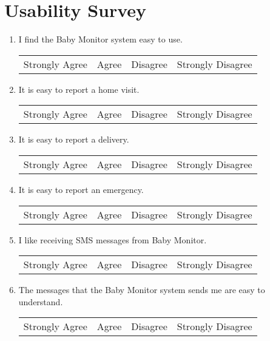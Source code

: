 \chapter{Usability Survey }

\begin{enumerate}
\item I find the Baby Monitor system easy to use.
{\begin{center}
\begin{tabular}{c c c c}
Strongly Agree & Agree & Disagree & Strongly Disagree \\
\end{tabular}
\end{center}}
\item It is easy to report a home visit. 
{\begin{center}
\begin{tabular}{c c c c}
Strongly Agree & Agree & Disagree & Strongly Disagree \\
\end{tabular}
\end{center}}
\item It is easy to report a delivery.
{\begin{center}
\begin{tabular}{c c c c}
Strongly Agree & Agree & Disagree & Strongly Disagree \\
\end{tabular}
\end{center}}
\item It is easy to report an emergency.
{\begin{center}
\begin{tabular}{c c c c}
Strongly Agree & Agree & Disagree & Strongly Disagree \\
\end{tabular}
\end{center}}
\item I like receiving SMS messages from Baby Monitor. 
{\begin{center}
\begin{tabular}{c c c c}
Strongly Agree & Agree & Disagree & Strongly Disagree \\
\end{tabular}
\end{center}}
\item The messages that the Baby Monitor system sends me are easy to understand. 
{\begin{center}
\begin{tabular}{c c c c}
Strongly Agree & Agree & Disagree & Strongly Disagree \\

\end{tabular}
\end{center}}
\end{enumerate}
